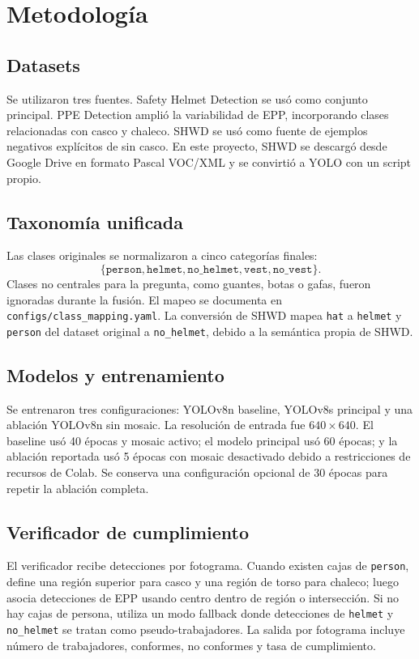 \documentclass{article}
\begin{document}
\section{Metodología}
\subsection{Datasets}
Se utilizaron tres fuentes. Safety Helmet Detection se usó como conjunto principal. PPE Detection amplió la variabilidad de EPP, incorporando clases relacionadas con casco y chaleco. SHWD se usó como fuente de ejemplos negativos explícitos de sin casco. En este proyecto, SHWD se descargó desde Google Drive en formato Pascal VOC/XML y se convirtió a YOLO con un script propio.

\subsection{Taxonomía unificada}
Las clases originales se normalizaron a cinco categorías finales:
\begin{equation}
\{\texttt{person},\texttt{helmet},\texttt{no\_helmet},\texttt{vest},\texttt{no\_vest}\}.
\end{equation}
Clases no centrales para la pregunta, como guantes, botas o gafas, fueron ignoradas durante la fusión. El mapeo se documenta en \texttt{configs/class\_mapping.yaml}. La conversión de SHWD mapea \texttt{hat} a \texttt{helmet} y \texttt{person} del dataset original a \texttt{no\_helmet}, debido a la semántica propia de SHWD.

\subsection{Modelos y entrenamiento}
Se entrenaron tres configuraciones: YOLOv8n baseline, YOLOv8s principal y una ablación YOLOv8n sin mosaic. La resolución de entrada fue $640\times640$. El baseline usó 40 épocas y mosaic activo; el modelo principal usó 60 épocas; y la ablación reportada usó 5 épocas con mosaic desactivado debido a restricciones de recursos de Colab. Se conserva una configuración opcional de 30 épocas para repetir la ablación completa.

\subsection{Verificador de cumplimiento}
El verificador recibe detecciones por fotograma. Cuando existen cajas de \texttt{person}, define una región superior para casco y una región de torso para chaleco; luego asocia detecciones de EPP usando centro dentro de región o intersección. Si no hay cajas de persona, utiliza un modo fallback donde detecciones de \texttt{helmet} y \texttt{no\_helmet} se tratan como pseudo-trabajadores. La salida por fotograma incluye número de trabajadores, conformes, no conformes y tasa de cumplimiento.
\end{document}
